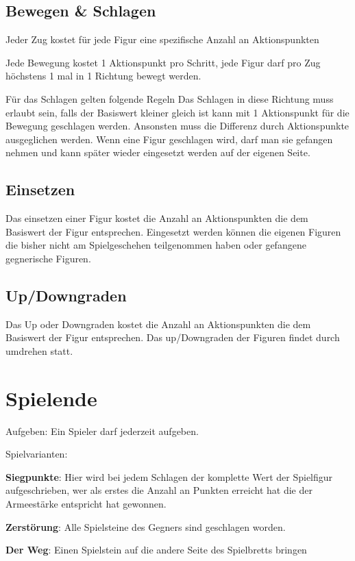 \documentclass{article}
\begin{document}
\subsection{Bewegen \& Schlagen}
Jeder Zug kostet für jede Figur eine spezifische Anzahl an Aktionspunkten

Jede Bewegung kostet 1 Aktionspunkt pro Schritt, jede Figur darf pro Zug höchstens 1 mal in 1 Richtung bewegt werden.

Für das Schlagen gelten folgende Regeln
Das Schlagen in diese Richtung muss erlaubt sein, falls der Basiswert kleiner gleich ist kann mit 1 Aktionspunkt für die Bewegung geschlagen werden. Ansonsten muss die Differenz durch Aktionspunkte ausgeglichen werden. Wenn eine Figur geschlagen wird, darf man sie gefangen nehmen und kann später wieder eingesetzt werden auf der eigenen Seite.
	
\subsection{Einsetzen}
Das einsetzen einer Figur kostet die Anzahl an Aktionspunkten die dem Basiswert der Figur entsprechen. Eingesetzt werden können die eigenen Figuren die bisher nicht am Spielgeschehen teilgenommen haben oder gefangene gegnerische Figuren.
	
\subsection{Up/Downgraden}
Das Up oder Downgraden kostet die Anzahl an Aktionspunkten die dem Basiswert der Figur entsprechen. Das up/Downgraden der Figuren findet durch umdrehen statt.

\section{Spielende}
Aufgeben: Ein Spieler darf jederzeit aufgeben.


\begin{flushleft}
Spielvarianten:

\textbf{Siegpunkte}: Hier wird bei jedem Schlagen der komplette Wert der Spielfigur aufgeschrieben, wer als erstes die Anzahl an Punkten erreicht hat die der Armeestärke entspricht hat gewonnen.

\textbf{Zerstörung}: Alle Spielsteine des Gegners sind geschlagen worden.

\textbf{Der Weg}: Einen Spielstein auf die andere Seite des Spielbretts bringen
\end{flushleft}
\end{document}
